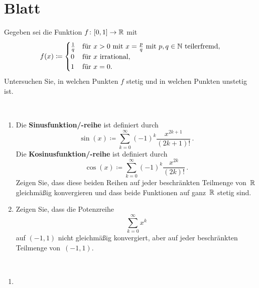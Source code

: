 \section{Blatt}

\begin{aufg}[6 Punkte]
Gegeben sei die Funktion $f\colon [0,1]\to\mathbb{R}$ mit 
\[
 f(x) \coloneqq 
 \begin{cases}
  \frac1q & \text{f\"ur~$x>0$ mit $x=\frac{p}{q}$ mit $p,q\in\mathbb{N}$ 
teilerfremd},
  \\
  0 & \text{f\"ur $x$ irrational},
  \\
  1 & \text{f\"ur $x=0$}.
 \end{cases}
\]
Untersuchen Sie, in welchen Punkten $f$ stetig und in welchen Punkten unstetig 
ist.
\end{aufg}

\bigskip


\begin{lsg}
\end{lsg}


\bigskip


\begin{aufg}[6 Punkte] \mbox{ }
\begin{enumerate}[label=$\mathrm{(\roman*)}$, ref=$\mathrm{\roman*}$]
\item Die \textbf{Sinusfunktion/-reihe} ist definiert durch 
\[
 \sin(x) \coloneqq \sum_{k=0}^\infty (-1)^k \frac{x^{2k+1}}{(2k+1)!}\,.
\]
Die \textbf{Kosinusfunktion/-reihe} ist definiert durch 
\[
 \cos(x) \coloneqq \sum_{k=0}^\infty (-1)^k \frac{x^{2k}}{(2k)!}\,.
\]
Zeigen Sie, dass diese beiden Reihen auf jeder beschr\"ankten Teilmenge 
von~$\mathbb{R}$ gleichm\"a{\ss}ig konvergieren und dass beide Funktionen auf ganz~$\mathbb{R}$ 
stetig sind.
%
\item Zeigen Sie, dass die Potenzreihe
\[
 \sum_{k=0}^\infty x^k
\]
auf $(-1,1)$ nicht gleichm\"a{\ss}ig konvergiert, aber auf jeder beschr\"ankten 
Teilmenge von~$(-1,1)$.
\end{enumerate}
\end{aufg}

\bigskip


\begin{lsg}\mbox{ }
\begin{enumerate}[label=$\mathrm{(\roman*)}$, ref=$\mathrm{\roman*}$]
\item 
\end{enumerate}
\end{lsg}


\bigskip


